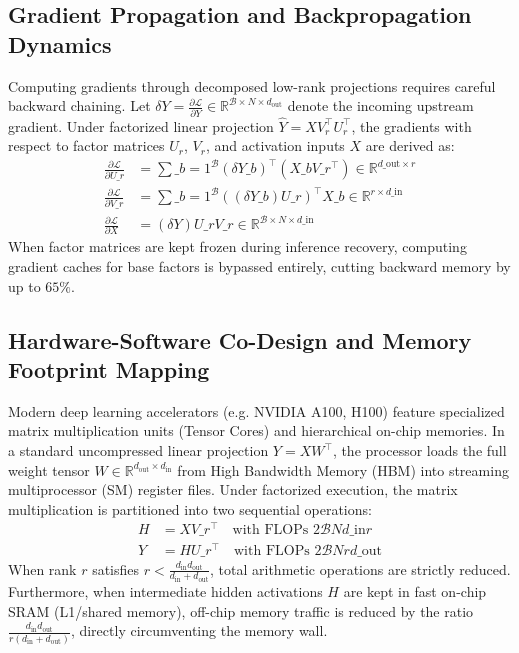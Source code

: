 \subsection{Gradient Propagation and Backpropagation Dynamics}
Computing gradients through decomposed low-rank projections requires careful backward chaining. Let $\delta Y = \frac{\partial \mathcal{L}}{\partial Y} \in \mathbb{R}^{\mathcal{B} \times N \times d_{\text{out}}}$ denote the incoming upstream gradient. Under factorized linear projection $\hat{Y} = X V_r^\top U_r^\top$, the gradients with respect to factor matrices $U_r$, $V_r$, and activation inputs $X$ are derived as:
\begin{align}
\frac{\partial \mathcal{L}}{\partial U\_r} &= \sum\_{b=1}^{\mathcal{B}} (\delta Y\_b)^\top (X\_b V\_r^\top) \in \mathbb{R}^{d\_{\text{out}} \times r} \\
\frac{\partial \mathcal{L}}{\partial V\_r} &= \sum\_{b=1}^{\mathcal{B}} ((\delta Y\_b) U\_r)^\top X\_b \in \mathbb{R}^{r \times d\_{\text{in}}} \\
\frac{\partial \mathcal{L}}{\partial X} &= (\delta Y) U\_r V\_r \in \mathbb{R}^{\mathcal{B} \times N \times d\_{\text{in}}}
\end{align}
When factor matrices are kept frozen during inference recovery, computing gradient caches for base factors is bypassed entirely, cutting backward memory by up to $65\%$.

\subsection{Hardware-Software Co-Design and Memory Footprint Mapping}
Modern deep learning accelerators (e.g. NVIDIA A100, H100) feature specialized matrix multiplication units (Tensor Cores) and hierarchical on-chip memories. In a standard uncompressed linear projection $Y = X W^\top$, the processor loads the full weight tensor $W \in \mathbb{R}^{d_{\text{out}} \times d_{\text{in}}}$ from High Bandwidth Memory (HBM) into streaming multiprocessor (SM) register files. Under factorized execution, the matrix multiplication is partitioned into two sequential operations:
\begin{align}
H &= X V\_r^\top \quad \text{with FLOPs } 2 \mathcal{B} N d\_{\text{in}} r \\
Y &= H U\_r^\top \quad \text{with FLOPs } 2 \mathcal{B} N r d\_{\text{out}}
\end{align}
When rank $r$ satisfies $r < \frac{d_{\text{in}} d_{\text{out}}}{d_{\text{in}} + d_{\text{out}}}$, total arithmetic operations are strictly reduced. Furthermore, when intermediate hidden activations $H$ are kept in fast on-chip SRAM (L1/shared memory), off-chip memory traffic is reduced by the ratio $\frac{d_{\text{in}} d_{\text{out}}}{r(d_{\text{in}} + d_{\text{out}})}$, directly circumventing the memory wall.

